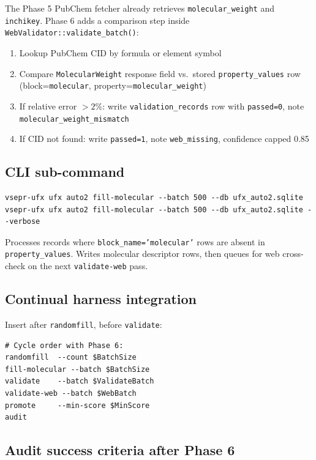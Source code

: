 \documentclass[11pt, a4paper]{article}
\begin{document}
The Phase 5 PubChem fetcher already retrieves \texttt{molecular\_weight} and
\texttt{inchikey}.  Phase 6 adds a comparison step inside
\texttt{WebValidator::validate\_batch()}:

\begin{enumerate}[leftmargin=*, itemsep=2pt]
  \item Lookup PubChem CID by formula or element symbol
  \item Compare \texttt{MolecularWeight} response field vs.\ stored
		\texttt{property\_values} row (block=\texttt{molecular}, property=\texttt{molecular\_weight})
  \item If relative error $> 2\%$: write \texttt{validation\_records} row with
		\texttt{passed=0}, note \texttt{molecular\_weight\_mismatch}
  \item If CID not found: write \texttt{passed=1}, note \texttt{web\_missing}, confidence capped 0.85
\end{enumerate}

\subsection{CLI sub-command}

\begin{lstlisting}[language={}]
vsepr-ufx ufx auto2 fill-molecular --batch 500 --db ufx_auto2.sqlite
vsepr-ufx ufx auto2 fill-molecular --batch 500 --db ufx_auto2.sqlite --verbose
\end{lstlisting}

Processes records where \texttt{block\_name='molecular'} rows are absent in
\texttt{property\_values}.  Writes molecular descriptor rows, then queues
for web cross-check on the next \texttt{validate-web} pass.

\subsection{Continual harness integration}

Insert after \texttt{randomfill}, before \texttt{validate}:

\begin{lstlisting}[language={}]
# Cycle order with Phase 6:
randomfill  --count $BatchSize
fill-molecular --batch $BatchSize
validate    --batch $ValidateBatch
validate-web --batch $WebBatch
promote     --min-score $MinScore
audit
\end{lstlisting}

\subsection{Audit success criteria after Phase 6}
\end{document}
